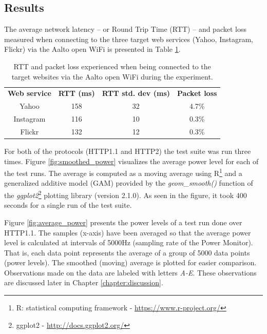 \documentclass{article}
\begin{document}
\subsection{Results}
\label{chapter:results}

The average network latency -- or Round Trip Time (RTT) -- and packet loss measured when connecting to the three target web services (Yahoo, Instagram, Flickr) via the Aalto open WiFi is presented in Table \ref{table:latency}.

\begin{table}[h!]
    \centering
    \begin{tabular}{c|c|c|c}
         \textbf{Web service} & \textbf{RTT (ms)} & \textbf{RTT std. dev (ms)} & \textbf{Packet loss} \\
        Yahoo   & 158 & 32 & 4.7\% \\
        Instagram  & 116 & 10 & 0.3\% \\
        Flickr & 132 & 12 & 0.3\% \\
    \end{tabular}
    \caption{RTT and packet loss experienced when being connected to the target websites via the Aalto open WiFi during the experiment.}
    \label{table:latency}
\end{table}

For both of the protocols (HTTP1.1 and HTTP2) the test suite was run three times. Figure \ref{fig:smoothed_power} visualizes the average power level for each of the test runs. The average is computed as a moving average using R\footnote{R: statistical computing framework - \url{https://www.r-project.org/}} and a generalized additive model (GAM) provided by the \emph{geom\_smooth()} function of the \emph{ggplot2}\footnote{ggplot2 - \url{http://docs.ggplot2.org/}} plotting library (version 2.1.0). As seen in the figure, it took 400 seconds for a single run of the test suite.

Figure \ref{fig:average_power} presents the power levels of a test run done over HTTP1.1. The samples (x-axis) have been averaged so that the average power level is calculated at intervals of 5000Hz (sampling rate of the Power Monitor). That is, each data point represents the average of a group of 5000 data points (power levels). The smoothed (moving) average is plotted for easier comparison. Observations made on the data are labeled with letters \emph{A-E}. These observations are discussed later in Chapter \ref{chapter:discussion}.
\end{document}

